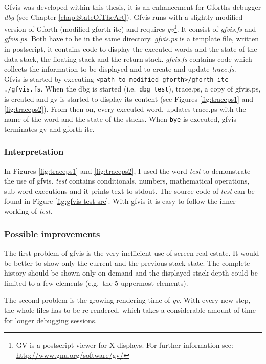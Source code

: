 Gfvis was developed within this thesis, it is an enhancement for Gforths debugger \emph{dbg} (see Chapter \ref{chap:StateOfTheArt}).
Gfvis runs with a slightly modified version of Gforth (modified gforth-itc) and requires \emph{gv}\footnote{GV is a postscript viewer for X displays. For further information see: \url{http://www.gnu.org/software/gv/}}. It consist of \emph{gfvis.fs} and \emph{gfvis.ps}. Both have to be in the same directory. \emph{gfvis.ps} is a template file, written in postscript, it contains code to display the executed words and the state of the data stack, the floating stack and the return stack. \emph{gfvis.fs} contains code which collects the information to be displayed and to create and update \emph{trace.fs}.
\\
Gfvis is started by executing \verb|<path to modified gforth>/gforth-itc ./gfvis.fs|. When the dbg is started (i.e.\ \verb|dbg test|), trace.ps, a copy of gfvis.ps, is created and gv is started to display its content (see Figures \ref{fig:traceps1} and \ref{fig:traceps2}). From then on, every executed word, updates trace.ps with the name of the word and the state of the stacks. When \verb|bye| is executed, gfvis terminates gv and gforth-itc.

\subsubsection*{Interpretation}

In Figures \ref{fig:traceps1} and \ref{fig:traceps2}, I used the word \emph{test} to demonstrate the use of gfvis. \emph{test} contains conditionals, numbers, mathematical operations, sub word executions and it prints text to stdout. The source code of \emph{test} can be found in Figure \ref{fig:gfvis-test-src}. With gfvis it is easy to follow the inner working of \emph{test}.

\subsubsection*{Possible improvements}

The first problem of gfvis is the very inefficient use of screen real estate. It would be better to show only the current and the previous stack state. The complete history should be shown only on demand and the displayed stack depth could be limited to a few elements (e.g.\ the 5 uppermost elements).

The second problem is the growing rendering time of \emph{gv}. With every new step, the whole files has to be re rendered, which takes a considerable amount of time for longer debugging sessions.

